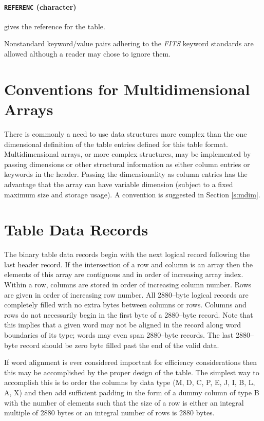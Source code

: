 \paragraph {{\tt REFERENC} (character)} gives 
the reference for the table. 

Nonstandard keyword/value pairs adhering to the {\em FITS\/} keyword 
standards are allowed although a reader may chose to ignore them.


\section{Conventions for Multidimensional Arrays}

     There is commonly a need to use data structures more complex than
the one dimensional definition of the table entries
defined for this table format.
Multidimensional arrays, or more
complex structures, may be implemented by passing dimensions or other
structural information as either column entries or keywords in the header.
Passing the dimensionality as column entries has the advantage that
the array can have variable dimension (subject to a fixed maximum
size and storage usage).  A convention is suggested in 
Section \ref{s:mdim}. 

\section{Table Data Records}

\label{s:btdr}
The binary table data records begin with the next logical record
following the last header record. If the intersection of a row and
column is an array then the elements of this array are contiguous and
in order
of increasing array index.  Within a row, columns are
stored in order of increasing column number.  Rows are given in order
of increasing row number.  All 2880--byte logical records are
completely filled with no extra bytes between columns or rows.
Columns and rows do not necessarily begin in the first byte of a
2880--byte record.  Note that this implies that a given word may not
be aligned in the record along word boundaries of its type; words may
even span 2880--byte records.  The last 2880--byte record should be
zero byte filled past the end of the valid data.

   If word alignment is ever considered important for efficiency
considerations then this may be accomplished by the proper design of
the table.  The simplest way to accomplish this is to order the
columns by data type (M, D, C, P, E, J, I, B, L, A, X) and then add
sufficient padding in the form of a dummy column of type B with the
number of elements such that the size of a row is either an integral
multiple of 2880 bytes or an integral number of rows is 2880 bytes.

